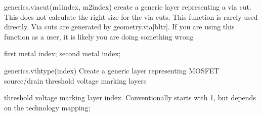 \begin{APIfunc}{generics.viacut(m1index, m2index)}
    create a generic layer representing a via cut. This does not calculate the right size for the via cuts. This function is rarely used directly. Via cuts are generated by geometry.via[bltr]. If you are using this function as a user, it is likely you are doing something wrong
    \begin{APIparameters}
            first metal index;
            second metal index;
    \end{APIparameters}
\end{APIfunc}
\begin{APIfunc}{generics.vthtype(index)}
    Create a generic layer representing MOSFET source/drain threshold voltage marking layers
    \begin{APIparameters}
            threshold voltage marking layer index. Conventionally starts with 1, but depends on the technology mapping;
    \end{APIparameters}
\end{APIfunc}
